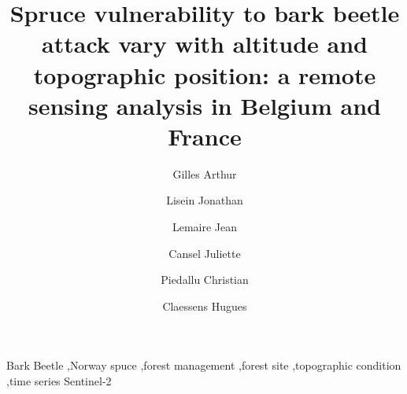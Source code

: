 \documentclass[3p,procedia]{elsarticle}
\begin{document}
\begin{frontmatter}

\author[label2]{Gilles Arthur}
\author[label2]{Lisein Jonathan}
\author[label3]{Lemaire Jean}
\author[label3]{Cansel Juliette}
\author{Piedallu Christian}
\author[label2]{Claessens Hugues}



\title{Spruce vulnerability to bark beetle attack vary with altitude and topographic position: a remote sensing analysis in Belgium and France}
\begin{abstract}
	

\end{abstract}

\begin{keyword}
Bark Beetle \sep Norway spuce \sep forest management \sep forest site \sep topographic condition \sep time series Sentinel-2
\end{keyword}

\end{frontmatter}
\end{document}
